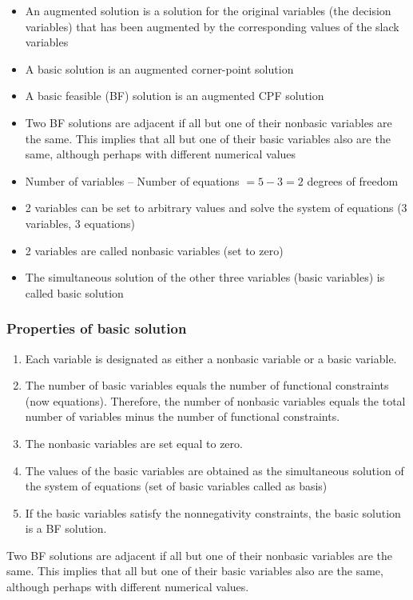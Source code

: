 \documentclass[12pt]{article}
\begin{document}
  \begin{itemize}
  \item An augmented solution is a solution for the original variables (the decision variables) that has been augmented by the corresponding values of the slack variables
  \item A basic solution is an augmented corner-point solution
  \item A basic feasible (BF) solution is an augmented CPF solution
  \item Two BF solutions are adjacent if all but one of their nonbasic variables are the same.
This implies that all but one of their basic variables also are the same, although perhaps
with different numerical values
  \end{itemize}


  \begin{itemize}
\item Number of variables -- Number of equations $= 5-3=2$ degrees of freedom
\item 2 variables can be set to arbitrary values and solve the system of equations (3 variables, 3 equations)
  \item 2 variables are called nonbasic variables (set to zero)
  \item The simultaneous solution of the other three variables (basic variables) is called basic solution
  \end{itemize}


  \subsubsection*{Properties of basic solution}
  \begin{enumerate}
  \item Each variable is designated as either a nonbasic variable or a basic variable.
  \item The number of basic variables equals the number of functional constraints (now equations). Therefore, the number of nonbasic 
variables equals the total number of variables minus the number of functional constraints.
\item The nonbasic variables are set equal to zero.
\item The values of the basic variables are obtained as the simultaneous solution of the system of equations (set of basic variables called as basis)
\item If the basic variables satisfy the nonnegativity constraints, the basic solution is a BF solution.
  \end{enumerate}
Two BF solutions are adjacent if all but one of their nonbasic variables are the same.
This implies that all but one of their basic variables also are the same, although perhaps
with different numerical values.
\end{document}
